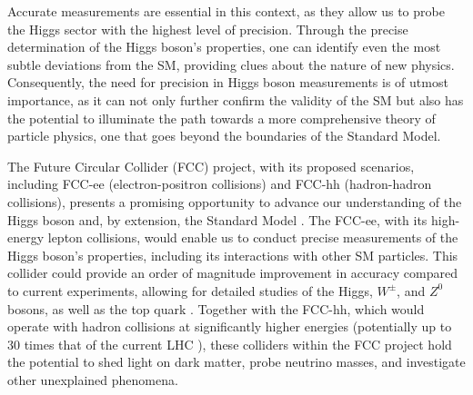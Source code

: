Accurate measurements are essential in this context, as they allow us to probe the Higgs sector with the highest level of precision. Through the precise determination of the Higgs boson's properties, one can identify even the most subtle deviations from the SM, providing clues about the nature of new physics. Consequently, the need for precision in Higgs boson measurements is of utmost importance, as it can not only further confirm the validity of the SM but also has the potential to illuminate the path towards a more comprehensive theory of particle physics, one that goes beyond the boundaries of the Standard Model.

The Future Circular Collider (FCC) project, with its proposed scenarios, including FCC-ee (electron-positron collisions) and FCC-hh (hadron-hadron collisions), presents a promising opportunity to advance our understanding of the Higgs boson and, by extension, the Standard Model \cite{FCC:2018byv}. The FCC-ee, with its high-energy lepton collisions, would enable us to conduct precise measurements of the Higgs boson's properties, including its interactions with other SM particles. This collider could provide an order of magnitude improvement in accuracy compared to current experiments, allowing for detailed studies of the Higgs, $W^\pm$, and $Z^0$ bosons, as well as the top quark \cite{Ellis:2015sca, dEnterria:2016fpc}. Together with the FCC-hh, which would operate with hadron collisions at significantly higher energies (potentially up to 30 times that of the current LHC \cite{FCC:2018vvp}), these colliders within the FCC project hold the potential to shed light on dark matter, probe neutrino masses, and investigate other unexplained phenomena.
